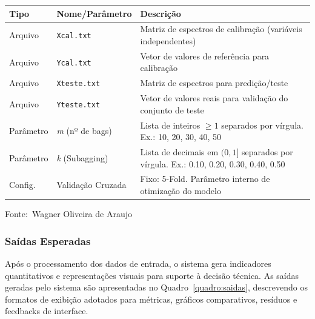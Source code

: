 \documentclass[12pt,a4paper]{article}
\newcommand{\oautor}{Wagner Oliveira de Araujo}
\begin{document}
\begin{quadro}[ht]
\centering
\small
\caption{Entradas necessárias para execução do sistema}
\label{quadro:entradas}
\begin{threeparttable}
\begin{tabularx}{\textwidth}{|l|l|X|} \hline
\textbf{Tipo} & \textbf{Nome/Parâmetro} & \textbf{Descrição} \\ \hline
Arquivo & \texttt{Xcal.txt} & Matriz de espectros de calibração (variáveis independentes) \\ \hline
Arquivo & \texttt{Ycal.txt} & Vetor de valores de referência para calibração \\ \hline
Arquivo & \texttt{Xteste.txt} & Matriz de espectros para predição/teste \\ \hline
Arquivo & \texttt{Yteste.txt} & Vetor de valores reais para validação do conjunto de teste \\ \hline
Parâmetro & \textit{m} (nº de bags) & Lista de inteiros $\ge 1$ separados por vírgula. Ex.: 10, 20, 30, 40, 50 \\ \hline
Parâmetro & \textit{k} (Subagging) & Lista de decimais em $(0, 1]$ separados por vírgula. Ex.: 0.10, 0.20, 0.30, 0.40, 0.50 \\ \hline
Config. & Validação Cruzada & Fixo: 5-Fold. Parâmetro interno de otimização do modelo \\ \hline
\end{tabularx}
\begin{tablenotes}[flushleft]
\footnotesize
\item Fonte:~\oautor
\end{tablenotes}
\end{threeparttable}
\end{quadro}

\subsubsection{Saídas Esperadas}

Após o processamento dos dados de entrada, o sistema gera indicadores quantitativos e representações visuais para suporte à decisão técnica. As saídas geradas pelo sistema são apresentadas no Quadro~\ref{quadro:saidas}, descrevendo os formatos de exibição adotados para métricas, gráficos comparativos, resíduos e feedbacks de interface.
\end{document}
